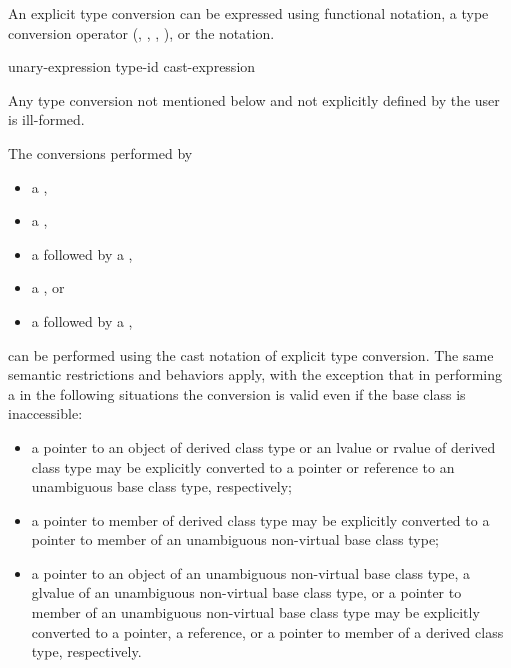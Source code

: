 \pnum
An explicit type conversion can be expressed using functional
notation, a type conversion operator
(, , ,
), or the  notation.

\begin{bnf}
\br
    unary-expression\br
    \terminal{(} type-id \terminal{)} cast-expression
\end{bnf}

\pnum
Any type conversion not mentioned below and not explicitly defined by
the user is ill-formed.

\pnum
The conversions performed by
\begin{itemize}
%
%
%
\item a ,
\item a ,
\item a  followed by a ,
\item a , or
\item a  followed by a ,
\end{itemize}
can be performed using the cast notation of explicit type conversion.
The same semantic restrictions and behaviors apply, with the exception
that in performing a  in the following situations the
conversion is valid even if the base class is inaccessible:
\begin{itemize}
\item a pointer to an object of derived class type or an lvalue or
rvalue of derived class type may be explicitly converted to a pointer or
reference to an unambiguous base class type, respectively;

\item a pointer to member of derived class type may be explicitly
converted to a pointer to member of an unambiguous non-virtual base
class type;

\item a pointer to an object of an unambiguous non-virtual base class
type, a glvalue of an unambiguous non-virtual base class type,
or a pointer to member of an unambiguous non-virtual base class type may
be explicitly converted to a pointer, a reference, or a pointer to
member of a derived class type, respectively.
\end{itemize}

